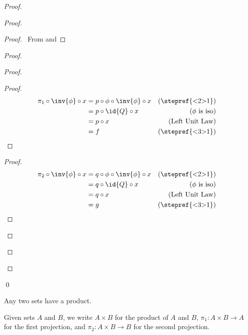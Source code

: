 \begin{proof}
\begin{proof}
    \begin{proof}
      \pf\ From  and 
    \end{proof}
    \begin{proof}
      \begin{proof}
        \begin{proof}
          \pf
          \begin{align*}
            \pi_1 \circ \inv{\phi} \circ x & = p \circ \phi \circ \inv{\phi} \circ x & (\text{\stepref{<2>1}})\\
            & = p \circ \id{Q} \circ x & (\text{$\phi$ is iso})\\
            & = p \circ x & (\text{Left Unit Law})\\
            & = f & (\text{\stepref{<3>1}})
          \end{align*}
        \end{proof}
        \begin{proof}
          \pf
          \begin{align*}
            \pi_2 \circ \inv{\phi} \circ x & = q \circ \phi \circ \inv{\phi} \circ x & (\text{\stepref{<2>1}})\\
            & = q \circ \id{Q} \circ x & (\text{$\phi$ is iso})\\
            & = q \circ x & (\text{Left Unit Law})\\
            & = g & (\text{\stepref{<3>1}})
          \end{align*}
        \end{proof}
      \end{proof}
    \end{proof}
  \end{proof}
  \qed
\end{proof}

\begin{ax}[Product]
  Any two sets have a product.
\end{ax}

Given sets $A$ and $B$, we write $A \times B$ for the product of $A$ and $B$, $\pi_1 : A \times B \rightarrow A$ for the first projection, and $\pi_2 : A \times B \rightarrow B$ for the second projection.

